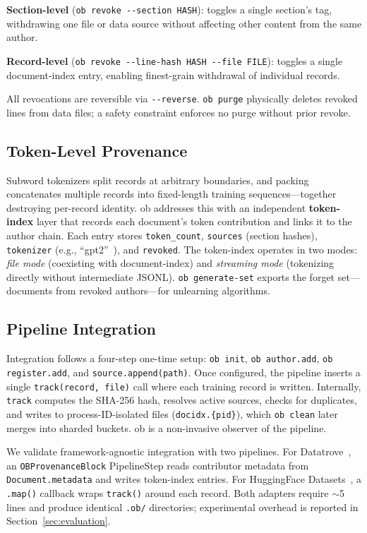 \noindent\textbf{Section-level} (\texttt{ob revoke -{}-section HASH}): toggles a single section's tag, withdrawing one file or data source without affecting other content from the same author.

\noindent\textbf{Record-level} (\texttt{ob revoke -{}-line-hash HASH -{}-file FILE}): toggles a single document-index entry, enabling finest-grain withdrawal of individual records.

All revocations are reversible via \texttt{-{}-reverse}. \texttt{ob purge} physically deletes revoked lines from data files; a safety constraint enforces no purge without prior revoke.

\subsection{Token-Level Provenance}

Subword tokenizers split records at arbitrary boundaries, and packing concatenates multiple records into fixed-length training sequences---together destroying per-record identity. ob addresses this with an independent \textbf{token-index} layer that records each document's token contribution and links it to the author chain. Each entry stores \texttt{token\_count}, \texttt{sources} (section hashes), \texttt{tokenizer} (e.g., ``gpt2''~\cite{radford2019gpt2}), and \texttt{revoked}. The token-index operates in two modes: \emph{file mode} (coexisting with document-index) and \emph{streaming mode} (tokenizing directly without intermediate JSONL). \texttt{ob generate-set} exports the forget set---documents from revoked authors---for unlearning algorithms.

\subsection{Pipeline Integration}

Integration follows a four-step one-time setup: \texttt{ob init}, \texttt{ob author.add}, \texttt{ob register.add}, and \texttt{source.append(path)}. Once configured, the pipeline inserts a single \texttt{track(record, file)} call where each training record is written. Internally, \texttt{track} computes the SHA-256 hash, resolves active sources, checks for duplicates, and writes to process-ID-isolated files (\texttt{docidx.\{pid\}}), which \texttt{ob clean} later merges into sharded buckets. ob is a non-invasive observer of the pipeline.

We validate framework-agnostic integration with two pipelines. For Datatrove~\cite{penedo2024datatrove}, an \texttt{OBProvenanceBlock} PipelineStep reads contributor metadata from \texttt{Document.metadata} and writes token-index entries. For HuggingFace Datasets~\cite{lhoest2021datasets}, a \texttt{.map()} callback wraps \texttt{track()} around each record. Both adapters require $\sim$5 lines and produce identical \texttt{.ob/} directories; experimental overhead is reported in Section~\ref{sec:evaluation}.
